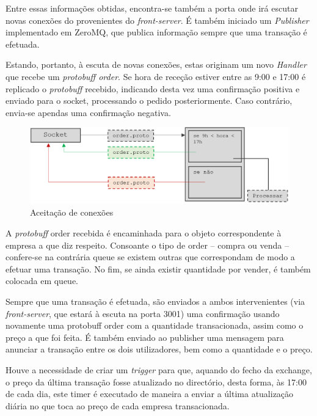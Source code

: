 \documentclass[a4paper,12pt]{article}
\begin{document}
\par Entre essas informações obtidas, encontra-se também a porta onde irá escutar novas conexões do provenientes do \textit{front-server}. É também iniciado um \textit{Publisher} implementado em ZeroMQ, que publica informação sempre que uma transação é efetuada.

\par Estando, portanto, à escuta de novas conexões, estas originam um novo \textit{Handler} que recebe um \textit{protobuff order}. Se hora de receção estiver entre as 9:00 e 17:00 é replicado o \textit{protobuff} recebido, indicando desta vez uma confirmação positiva e enviado para o socket, processando o pedido posteriormente. Caso contrário, envia-se apendas uma confirmação negativa.

\begin{figure}[h]
  \centering
      \includegraphics[width=1\textwidth]{d1.png}
  \caption{Aceitação de conexões}
\end{figure}

\par A \textit{protobuff} order recebida é encaminhada para o objeto correspondente à empresa a que diz respeito. Consoante o tipo de order – compra ou venda – confere-se na contrária queue se existem outras que correspondam de modo a efetuar uma transação. No fim, se ainda existir quantidade por vender, é também colocada em queue.
\par Sempre que uma transação é efetuada, são enviados a ambos intervenientes (via \textit{front-server}, que estará à escuta na porta 3001) uma confirmação usando novamente uma protobuff order com a quantidade transacionada, assim como o preço a que foi feita.  É também enviado ao publisher uma mensagem para anunciar a transação entre os dois utilizadores, bem como a quantidade e o preço.  
\par Houve a necessidade de criar um \textit{trigger} para que, aquando do fecho da exchange, o preço da última transação fosse atualizado no directório, desta forma, às 17:00 de cada dia, este timer é executado de maneira a enviar a última atualização diária no que toca ao preço de cada empresa transacionada.
\end{document}
